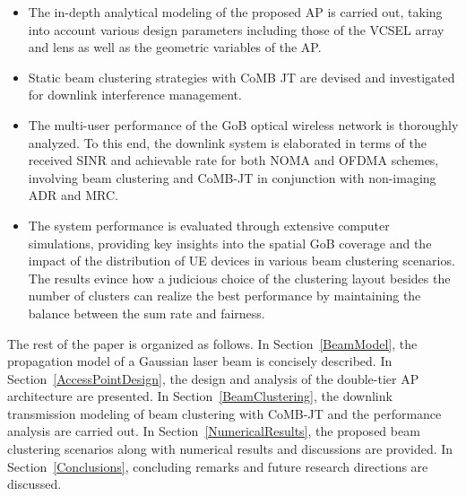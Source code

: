 \documentclass[lettersize,journal]{IEEEtran}
\begin{document}
\begin{itemize}
    \item The in-depth analytical modeling of the proposed \ac{AP} is carried out, taking into account various design parameters including those of the \ac{VCSEL} array and lens as well as the geometric variables of the \ac{AP}.
    \item Static beam clustering strategies with \ac{CoMB} \ac{JT} are devised and investigated for downlink interference management.
    \item The multi-user performance of the \ac{GoB} optical wireless network is thoroughly analyzed. To this end, the downlink system is elaborated in terms of the received \ac{SINR} and achievable rate for both \ac{NOMA} and \ac{OFDMA} schemes, involving beam clustering and \ac{CoMB}-\ac{JT} in conjunction with non-imaging \ac{ADR} and \ac{MRC}.
    \item The system performance is evaluated through extensive computer simulations, providing key insights into the spatial \ac{GoB} coverage and the impact of the distribution of \ac{UE} devices in various beam clustering scenarios. The results evince how a judicious choice of the clustering layout besides the number of clusters can realize the best performance by maintaining the balance between the sum rate and fairness.
\end{itemize}

The rest of the paper is organized as follows. In Section~\ref{BeamModel}, the propagation model of a Gaussian laser beam is concisely described. In Section~\ref{AccessPointDesign}, the design and analysis of the double-tier \ac{AP} architecture are presented. In Section~\ref{BeamClustering}, the downlink transmission modeling of beam clustering with \ac{CoMB}-\ac{JT} and the performance analysis are carried out. In Section~\ref{NumericalResults}, the proposed beam clustering scenarios along with numerical results and discussions are provided. In Section~\ref{Conclusions}, concluding remarks and future research directions are discussed.

\vspace{-3pt}

\end{document}
